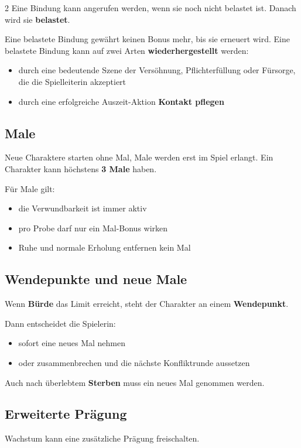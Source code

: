 \begin{multicols*}{2}
Eine Bindung kann angerufen werden, wenn sie noch nicht belastet ist. Danach wird sie \textbf{belastet}.

Eine belastete Bindung gewährt keinen Bonus mehr, bis sie erneuert wird. Eine belastete Bindung kann auf zwei Arten \textbf{wiederhergestellt} werden:

\begin{itemize}[leftmargin=*]
\item durch eine bedeutende Szene der Versöhnung, Pflichterfüllung oder Fürsorge, die die Spielleiterin akzeptiert
\item durch eine erfolgreiche Auszeit-Aktion \textbf{Kontakt pflegen}
\end{itemize}

\subsection{Male}\label{sec:male2}

Neue Charaktere starten ohne Mal, Male werden erst im Spiel erlangt.
Ein Charakter kann höchstens \textbf{3 Male} haben.

Für Male gilt:
\begin{itemize}[leftmargin=*]
\item die Verwundbarkeit ist immer aktiv
\item pro Probe darf nur ein Mal-Bonus wirken
\item Ruhe und normale Erholung entfernen kein Mal
\end{itemize}

\subsection{Wendepunkte und neue Male}\label{sec:wendepunkte-und-neue-male}
Wenn \textbf{Bürde} das Limit erreicht, steht der Charakter an einem \textbf{Wendepunkt}.

Dann entscheidet die Spielerin:
\begin{itemize}[leftmargin=*]
\item sofort eine neues Mal nehmen
\item oder zusammenbrechen und die nächste Konfliktrunde aussetzen
\end{itemize}

Auch nach überlebtem \textbf{Sterben} muss ein neues Mal genommen werden.

\subsection{Erweiterte Prägung}\label{sec:erweiterte-pragung}
Wachstum kann eine zusätzliche Prägung freischalten.


\end{multicols*}
